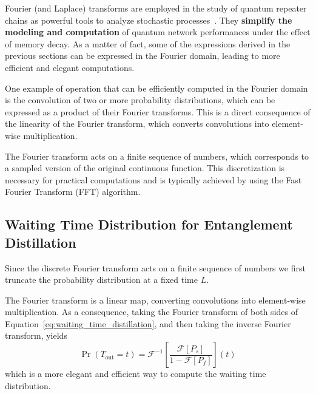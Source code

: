 \documentclass{masterthesis}
\begin{document}
Fourier (and Laplace) transforms are employed in the study of quantum repeater chains as powerful tools to analyze stochastic processes~\cite{Kuzmin_2021}. They \textbf{simplify the modeling and computation} of quantum network performances under the effect of memory decay.
As a matter of fact, some of the expressions derived in the previous sections can be expressed in the Fourier domain, leading to more efficient and elegant computations.

One example of operation that can be efficiently computed in the Fourier domain is the convolution of two or more probability distributions, which can be expressed as a product of their Fourier transforms. This is a direct consequence of the linearity of the Fourier transform, which converts convolutions into element-wise multiplication.

The Fourier transform acts on a finite sequence of numbers, which corresponds to a sampled version of the original continuous function. This discretization is necessary for practical computations and is typically achieved by using the Fast Fourier Transform (FFT) algorithm. 


\subsection{Waiting Time Distribution for Entanglement Distillation}

Since the discrete Fourier transform acts on a finite sequence of numbers we first truncate the probability distribution at a fixed time $L$.

The Fourier transform is a linear map, converting convolutions into element-wise multiplication. As a consequence, taking the Fourier transform of both sides of Equation~\ref{eq:waiting_time_distillation}, and then taking the inverse Fourier transform, yields
\begin{equation}\label{eq:waiting_time_distillation_fourier}
    \Pr(T_{\text{out}} = t) = \mathcal{F}^{-1} \left[ \frac{\mathcal{F}[P_s]}{1 - \mathcal{F}[P_f]} \right](t)
\end{equation}
which is a more elegant and efficient way to compute the waiting time distribution.
\end{document}
